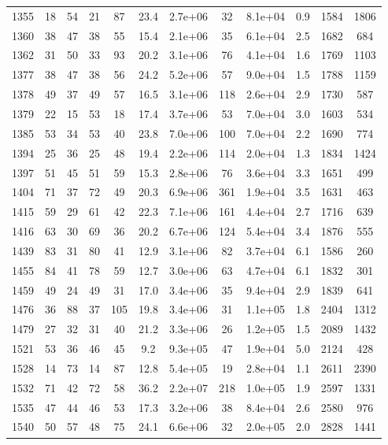 \begin{table}
\begin{tabular}{cccccccccccc}
1355 & 18 & 54 & 21 & 87 & 23.4 & 2.7e+06 & 32 & 8.1e+04 & 0.9 & 1584 & 1806 \\
1360 & 38 & 47 & 38 & 55 & 15.4 & 2.1e+06 & 35 & 6.1e+04 & 2.5 & 1682 & 684 \\
1362 & 31 & 50 & 33 & 93 & 20.2 & 3.1e+06 & 76 & 4.1e+04 & 1.6 & 1769 & 1103 \\
1377 & 38 & 47 & 38 & 56 & 24.2 & 5.2e+06 & 57 & 9.0e+04 & 1.5 & 1788 & 1159 \\
1378 & 49 & 37 & 49 & 57 & 16.5 & 3.1e+06 & 118 & 2.6e+04 & 2.9 & 1730 & 587 \\
1379 & 22 & 15 & 53 & 18 & 17.4 & 3.7e+06 & 53 & 7.0e+04 & 3.0 & 1603 & 534 \\
1385 & 53 & 34 & 53 & 40 & 23.8 & 7.0e+06 & 100 & 7.0e+04 & 2.2 & 1690 & 774 \\
1394 & 25 & 36 & 25 & 48 & 19.4 & 2.2e+06 & 114 & 2.0e+04 & 1.3 & 1834 & 1424 \\
1397 & 51 & 45 & 51 & 59 & 15.3 & 2.8e+06 & 76 & 3.6e+04 & 3.3 & 1651 & 499 \\
1404 & 71 & 37 & 72 & 49 & 20.3 & 6.9e+06 & 361 & 1.9e+04 & 3.5 & 1631 & 463 \\
1415 & 59 & 29 & 61 & 42 & 22.3 & 7.1e+06 & 161 & 4.4e+04 & 2.7 & 1716 & 639 \\
1416 & 63 & 30 & 69 & 36 & 20.2 & 6.7e+06 & 124 & 5.4e+04 & 3.4 & 1876 & 555 \\
1439 & 83 & 31 & 80 & 41 & 12.9 & 3.1e+06 & 82 & 3.7e+04 & 6.1 & 1586 & 260 \\
1455 & 84 & 41 & 78 & 59 & 12.7 & 3.0e+06 & 63 & 4.7e+04 & 6.1 & 1832 & 301 \\
1459 & 49 & 24 & 49 & 31 & 17.0 & 3.4e+06 & 35 & 9.4e+04 & 2.9 & 1839 & 641 \\
1476 & 36 & 88 & 37 & 105 & 19.8 & 3.4e+06 & 31 & 1.1e+05 & 1.8 & 2404 & 1312 \\
1479 & 27 & 32 & 31 & 40 & 21.2 & 3.3e+06 & 26 & 1.2e+05 & 1.5 & 2089 & 1432 \\
1521 & 53 & 36 & 46 & 45 & 9.2 & 9.3e+05 & 47 & 1.9e+04 & 5.0 & 2124 & 428 \\
1528 & 14 & 73 & 14 & 87 & 12.8 & 5.4e+05 & 19 & 2.8e+04 & 1.1 & 2611 & 2390 \\
1532 & 71 & 42 & 72 & 58 & 36.2 & 2.2e+07 & 218 & 1.0e+05 & 1.9 & 2597 & 1331 \\
1535 & 47 & 44 & 46 & 53 & 17.3 & 3.2e+06 & 38 & 8.4e+04 & 2.6 & 2580 & 976 \\
1540 & 50 & 57 & 48 & 75 & 24.1 & 6.6e+06 & 32 & 2.0e+05 & 2.0 & 2828 & 1441 \\

\end{tabular}
\end{table}
